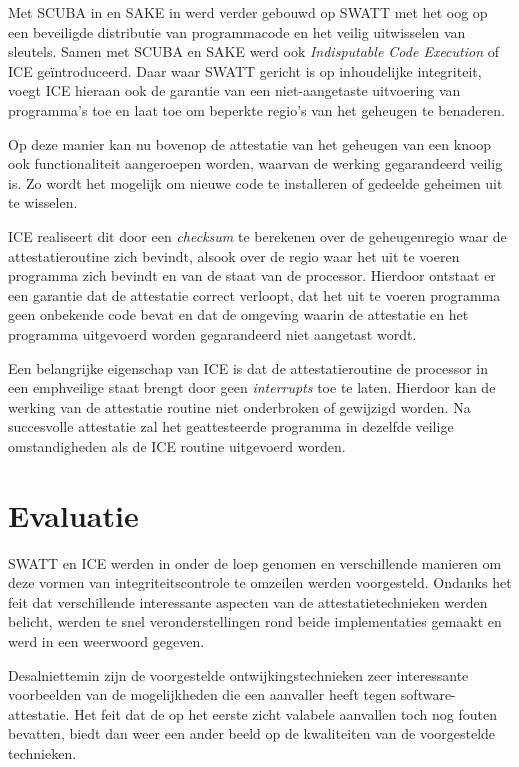 Met SCUBA in \citep{seshadri2006scuba} en SAKE in \citep{seshadri2008sake} werd
verder gebouwd op SWATT met het oog op een beveiligde distributie van
programmacode en het veilig uitwisselen van sleutels. Samen met SCUBA en SAKE
werd ook \emph{Indisputable Code Execution} of ICE ge\"introduceerd. Daar waar
SWATT gericht is op inhoudelijke integriteit, voegt ICE hieraan ook de garantie
van een niet-aangetaste uitvoering van programma's toe en laat toe om beperkte
regio's van het geheugen te benaderen.

Op deze manier kan nu bovenop de attestatie van het geheugen van een knoop ook
functionaliteit aangeroepen worden, waarvan de werking gegarandeerd veilig is.
Zo wordt het mogelijk om nieuwe code te installeren of gedeelde geheimen uit te
wisselen.

ICE realiseert dit door een \emph{checksum} te berekenen over de geheugenregio
waar de attestatieroutine zich bevindt, alsook over de regio waar het uit te
voeren programma zich bevindt en van de staat van de processor. Hierdoor
ontstaat er een garantie dat de attestatie correct verloopt, dat het uit te
voeren programma geen onbekende code bevat en dat de omgeving waarin de
attestatie en het programma uitgevoerd worden gegarandeerd niet aangetast wordt.

Een belangrijke eigenschap van ICE is dat de attestatieroutine de processor in
een emph{veilige} staat brengt door geen \emph{interrupts} toe te laten.
Hierdoor kan de werking van de attestatie routine niet onderbroken of gewijzigd
worden. Na succesvolle attestatie zal het geattesteerde programma in dezelfde
veilige omstandigheden als de ICE routine uitgevoerd worden.

\section{Evaluatie}

SWATT en ICE werden in \citep{castelluccia2009difficulty} onder de loep genomen
en verschillende manieren om deze vormen van integriteitscontrole te omzeilen
werden voorgesteld. Ondanks het feit dat verschillende interessante aspecten
van de attestatietechnieken werden belicht, werden te snel veronderstellingen
rond beide implementaties gemaakt en werd in \citep{perrig2010refutation} een
weerwoord gegeven.

Desalniettemin zijn de voorgestelde ontwijkingstechnieken zeer interessante
voorbeelden van de mogelijkheden die een aanvaller heeft tegen
software-attestatie. Het feit dat de op het eerste zicht valabele aanvallen
toch nog fouten bevatten, biedt dan weer een ander beeld op de kwaliteiten van
de voorgestelde technieken.

